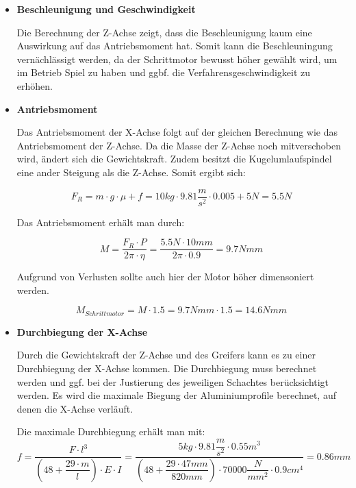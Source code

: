 \documentclass{scrartcl}
\begin{document}
\begin{itemize}

\item \textbf{Beschleunigung und Geschwindigkeit}

Die Berechnung der Z-Achse zeigt, dass die Beschleunigung kaum eine Auswirkung auf das Antriebsmoment hat. Somit kann die Beschleuningung vernächlässigt werden, da der Schrittmotor bewusst höher gewählt wird, um im Betrieb Spiel zu haben und ggbf. die Verfahrensgeschwindigkeit zu erhöhen.


\item \textbf{Antriebsmoment}

Das Antriebsmoment der X-Achse folgt auf der gleichen Berechnung wie das Antriebsmoment der Z-Achse. Da die Masse der Z-Achse noch mitverschoben wird, ändert sich die Gewichtskraft. Zudem besitzt die Kugelumlaufspindel eine ander Steigung als die Z-Achse. Somit ergibt sich:

\[F_R=m \cdot g\cdot \mu + f=10kg\cdot 9.81\dfrac{m}{s^2}  \cdot 0.005 + 5N=5.5N\]


Das Antriebsmoment erhält man durch: 

\[M=\dfrac{F_R\cdot P}{2\pi \cdot \eta}=\dfrac{5.5N\cdot 10mm}{2\pi \cdot 0.9}=9.7Nmm\]

Aufgrund von Verlusten sollte auch hier der Motor höher dimensoniert werden.

\[M_{Schrittmotor}=M \cdot 1.5 = 9.7Nmm \cdot 1.5 = 14.6Nmm\]


\item \textbf{Durchbiegung der X-Achse}

Durch die Gewichtskraft der Z-Achse und des Greifers kann es zu einer Durchbiegung der X-Achse kommen. Die Durchbiegung muss berechnet werden und ggf. bei der Justierung des jeweiligen Schachtes berücksichtigt werden. Es wird die maximale Biegung der Aluminiumprofile berechnet, auf denen die X-Achse verläuft.\\
\newline



Die maximale Durchbiegung erhält man mit:\\

\[f=\dfrac{F\cdot l^3}{(48+\dfrac{29\cdot m}{l})\cdot E \cdot I} = \dfrac{5kg\cdot 9.81\dfrac{m}{s^2}\cdot 0.55m^3}{(48+\dfrac{29\cdot 47mm}{820mm})\cdot 70000\dfrac{N}{mm^2}\cdot 0.9cm^4} = 0.86mm\]


\end{itemize}
\end{document}
